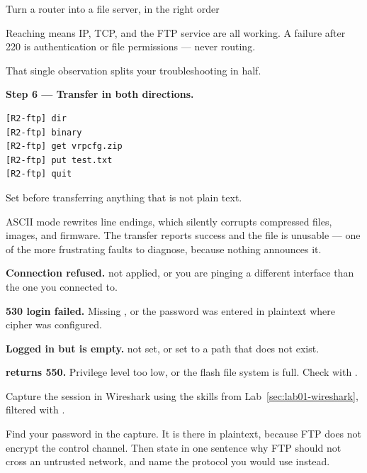 \begin{labproject}{Turn a router into a file server, in the right order}
\begin{keyidea}
Reaching  means IP, TCP, and the FTP service are all working. A failure after 220 is authentication or file permissions --- never routing.

That single observation splits your troubleshooting in half.
\end{keyidea}

\medskip\noindent\textbf{Step 6 --- Transfer in both directions.}\par

\begin{lstlisting}[style=dcnterminal]
[R2-ftp] dir
[R2-ftp] binary
[R2-ftp] get vrpcfg.zip
[R2-ftp] put test.txt
[R2-ftp] quit
\end{lstlisting}

\begin{pitfall}
Set  before transferring anything that is not plain text.

ASCII mode rewrites line endings, which silently corrupts compressed files, images, and firmware. The transfer reports success and the file is unusable --- one of the more frustrating faults to diagnose, because nothing announces it.
\end{pitfall}

\begin{troubleshoot}
\textbf{Connection refused.}  not applied, or you are pinging a different interface than the one you connected to.

\textbf{530 login failed.} Missing , or the password was entered in plaintext where cipher was configured.

\textbf{Logged in but  is empty.}  not set, or set to a path that does not exist.

\textbf{ returns 550.} Privilege level too low, or the flash file system is full. Check with .
\end{troubleshoot}

\begin{tryit}
Capture the session in Wireshark using the skills from Lab~\ref{sec:lab01-wireshark}, filtered with .

Find your password in the capture. It is there in plaintext, because FTP does not encrypt the control channel. Then state in one sentence why FTP should not cross an untrusted network, and name the protocol you would use instead.
\end{tryit}
\end{labproject}

